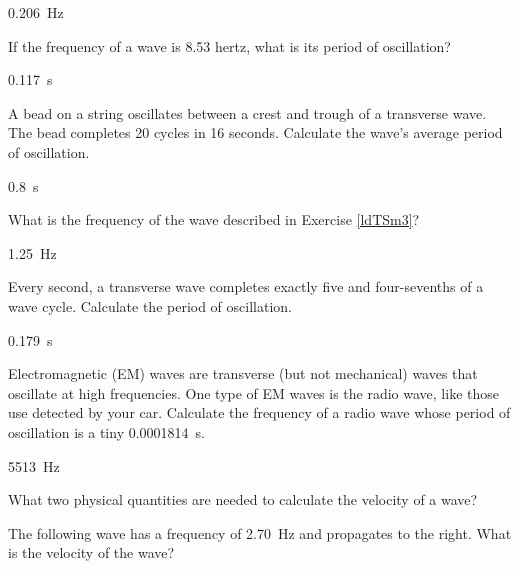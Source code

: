 \documentclass[]{exam}
\begin{document}
\begin{questions}
\begin{solution}
\SI{0.206}{Hz}
\end{solution}




\question \label{EeHAB4} 
If the frequency of a wave is 8.53 hertz, what is its period of oscillation?


\begin{solution}
\SI{0.117}{s}
\end{solution}

\question \label{ldTSm3} 
A bead on a string oscillates between a crest and trough of a transverse wave. The bead completes 20 cycles in 16 seconds. Calculate the wave's average period of oscillation. 


\begin{solution}
\SI{0.8}{s}
\end{solution}

\question \label{3rLSIq}
What is the frequency of the wave described in Exercise \ref{ldTSm3}?


\begin{solution}
\SI{1.25}{Hz}
\end{solution}

\question \label{gz0LQL} 
Every second, a transverse wave completes exactly five and four-sevenths of a wave cycle. Calculate the period of oscillation.


\begin{solution}
\SI{0.179}{s}
\end{solution}

\question \label{MITNpN} 
Electromagnetic (EM) waves are transverse (but not mechanical) waves that oscillate at high frequencies. One type of EM waves is the radio wave, like those use detected by your car. Calculate the frequency of a radio wave whose period of oscillation is a tiny \SI[group-separator={\,}]{0.0001814}{s}.


\begin{solution}
    \SI{5513}{Hz}
\end{solution}

\question
What two physical quantities are needed to calculate the velocity of a wave?


\question \label{SKv3ek}
The following wave has a frequency of \SI{2.70}{Hz} and propagates to the right. What is the velocity of the wave?


\begin{center}
\end{center}



\end{questions}
\end{document}
